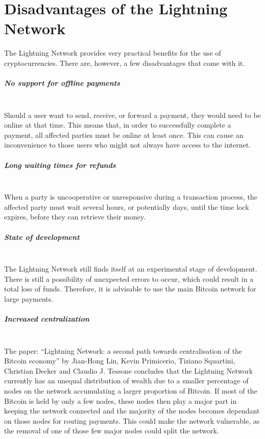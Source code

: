 \documentclass[a4paper, 12pt]{report}
\begin{document}
\chapter{Disadvantages of the Lightning Network}

\par The Lightning Network provides very practical benefits for the use of cryptocurrencies. There are, however, a few disadvantages that come with it.

\paragraph{No support for offline payments} \hspace{0pt} \\
Should a user want to send, receive, or forward a payment, they would need to be online at that time. This means that, in order to successfully complete a payment, all affected parties must be online at least once. This can cause an inconvenience to those users who might not always have access to the internet.

\paragraph{Long waiting times for refunds} \hspace{0pt} \\
When a party is uncooperative or unresponsive during a transaction process, the affected party must wait several hours, or potentially days, until the time lock expires, before they can retrieve their money.

\paragraph{State of development} \hspace{0pt} \\
The Lightning Network still finds itself at an experimental stage of development. There is still a possibility of unexpected errors to occur, which could result in a total loss of funds. Therefore, it is advisable to use the main Bitcoin network for large payments.

\paragraph{Increased centralization} \hspace{0pt} \\
The paper: “Lightning Network: a second path towards centralisation of the Bitcoin economy” by Jian-Hong Lin, Kevin Primicerio, Tiziano Squartini, Christian Decker and Claudio J. Tessone concludes that the Lightning Network currently has an unequal distribution of wealth due to a smaller percentage of nodes on the network accumulating a larger proportion of Bitcoin. If most of the Bitcoin is held by only a few nodes, these nodes then play a major part in keeping the network connected and the majority of the nodes becomes dependant on those nodes for routing payments. This could make the network vulnerable, as the removal of one of those few major nodes could split the network.
\end{document}
